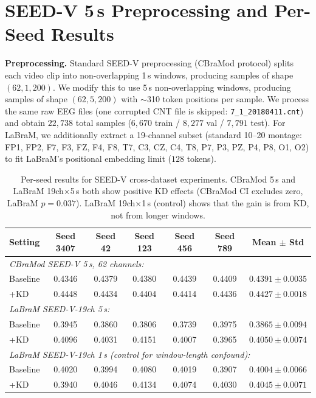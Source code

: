 \section{SEED-V 5\,s Preprocessing and Per-Seed Results}
\label{sec:supp_seedv5s}

\noindent\textbf{Preprocessing.} Standard SEED-V preprocessing (CBraMod protocol) splits each video clip into non-overlapping 1\,s windows, producing samples of shape $(62, 1, 200)$. We modify this to use 5\,s non-overlapping windows, producing samples of shape $(62, 5, 200)$ with $\sim$310 token positions per sample. We process the same raw EEG files (one corrupted CNT file is skipped: \texttt{7\_1\_20180411.cnt}) and obtain $22{,}738$ total samples ($6{,}670$ train / $8{,}277$ val / $7{,}791$ test). For LaBraM, we additionally extract a 19-channel subset (standard 10--20 montage: FP1, FP2, F7, F3, FZ, F4, F8, T7, C3, CZ, C4, T8, P7, P3, PZ, P4, P8, O1, O2) to fit LaBraM's positional embedding limit ($128$ tokens).

\begin{table}[!h]
\caption{Per-seed results for SEED-V cross-dataset experiments. CBraMod 5\,s and LaBraM 19ch$\times$5\,s both show positive KD effects (CBraMod CI excludes zero, LaBraM $p = 0.037$). LaBraM 19ch$\times$1\,s (control) shows that the gain is from KD, not from longer windows.}
\small
\centering
\begin{tabular}{lcccccc}
\toprule
Setting & Seed 3407 & Seed 42 & Seed 123 & Seed 456 & Seed 789 & Mean $\pm$ Std \\
\midrule
\multicolumn{7}{l}{\textit{CBraMod SEED-V 5\,s, 62 channels:}} \\
Baseline & 0.4346 & 0.4379 & 0.4380 & 0.4439 & 0.4409 & $0.4391 \pm 0.0035$ \\
+KD & 0.4448 & 0.4434 & 0.4404 & 0.4414 & 0.4436 & $0.4427 \pm 0.0018$ \\
\midrule
\multicolumn{7}{l}{\textit{LaBraM SEED-V-19ch 5\,s:}} \\
Baseline & 0.3945 & 0.3860 & 0.3806 & 0.3739 & 0.3975 & $0.3865 \pm 0.0094$ \\
+KD & 0.4096 & 0.4031 & 0.4151 & 0.4007 & 0.3965 & $0.4050 \pm 0.0074$ \\
\midrule
\multicolumn{7}{l}{\textit{LaBraM SEED-V-19ch 1\,s (control for window-length confound):}} \\
Baseline & 0.4020 & 0.3994 & 0.4080 & 0.4019 & 0.3907 & $0.4004 \pm 0.0066$ \\
+KD & 0.3940 & 0.4046 & 0.4134 & 0.4074 & 0.4030 & $0.4045 \pm 0.0071$ \\
\bottomrule
\end{tabular}
\label{tab:supp_seedv5s}
\end{table}

